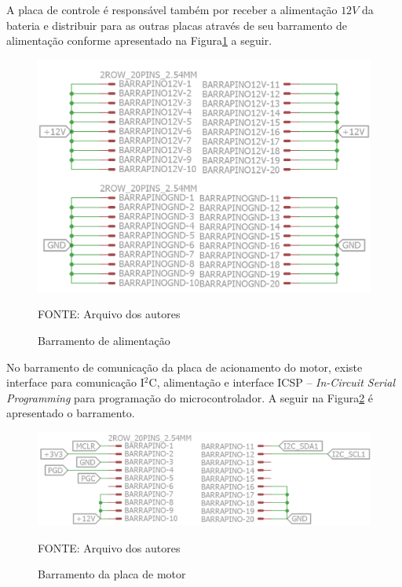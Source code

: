 \documentclass[
	12pt,				%
	openany,			%
	twoside,			%
	a4paper,			%
	english,			%
	french,				%
	spanish,			%
	brazil,				%
	oldfontcommands
	]{abntex2}
\begin{document}
A placa de controle é responsável também por receber a alimentação $12V$ da bateria e distribuir para as outras placas através de seu barramento de alimentação conforme apresentado na Figura\ref{fig:Barra_pino_alimentacao_master} a seguir.

\begin{figure}[th]
	\caption{Barramento de alimentação}
	\centering
	\includegraphics[width=0.8\linewidth]{./figs/Barra_pino_alimentacao_master}
	
	\begin{small}
		FONTE: Arquivo dos autores
	\end{small}
	\label{fig:Barra_pino_alimentacao_master}
\end{figure} 

No barramento de comunicação da placa de acionamento do motor, existe interface para comunicação I$^{2}$C, alimentação e interface ICSP – \textit{In-Circuit Serial Programming} para programação do microcontrolador. A seguir na Figura\ref{fig:Barra_pino_motores} é apresentado o barramento.

\begin{figure}[th]
	\caption{Barramento da placa de motor}
	\centering
	\includegraphics[width=0.8\linewidth]{./figs/Barra_pino_motores}
	
	\begin{small}
		FONTE: Arquivo dos autores
	\end{small}
	\label{fig:Barra_pino_motores}
\end{figure} 
\end{document}
